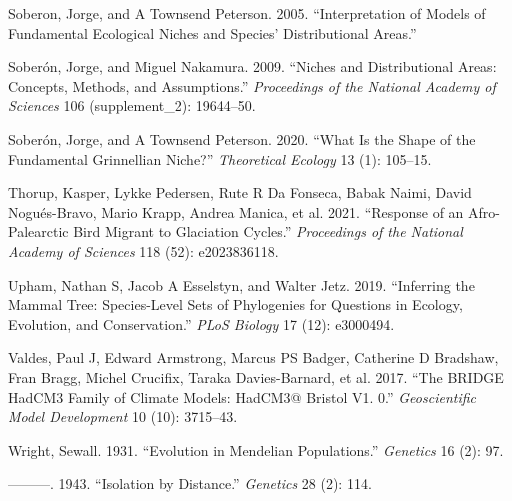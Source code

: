 \documentclass[
]{article}
\newlength{\cslhangindent}
\newlength{\cslentryspacingunit} %
\newenvironment{CSLReferences}[2] %
 {%
  \setlength{\parindent}{0pt}
  \ifodd #1
  \let\oldpar\par
  \def\par{\hangindent=\cslhangindent\oldpar}
  \fi
  \setlength{\parskip}{#2\cslentryspacingunit}
 }%
 {}
\begin{document}
\begin{CSLReferences}{1}{0}
\leavevmode{}%
Soberon, Jorge, and A Townsend Peterson. 2005. {``Interpretation of
Models of Fundamental Ecological Niches and Species' Distributional
Areas.''}

\leavevmode{}%
Soberón, Jorge, and Miguel Nakamura. 2009. {``Niches and Distributional
Areas: Concepts, Methods, and Assumptions.''} \emph{Proceedings of the
National Academy of Sciences} 106 (supplement\_2): 19644--50.

\leavevmode{}%
Soberón, Jorge, and A Townsend Peterson. 2020. {``What Is the Shape of
the Fundamental Grinnellian Niche?''} \emph{Theoretical Ecology} 13 (1):
105--15.

\leavevmode{}%
Thorup, Kasper, Lykke Pedersen, Rute R Da Fonseca, Babak Naimi, David
Nogués-Bravo, Mario Krapp, Andrea Manica, et al. 2021. {``Response of an
Afro-Palearctic Bird Migrant to Glaciation Cycles.''} \emph{Proceedings
of the National Academy of Sciences} 118 (52): e2023836118.

\leavevmode{}%
Upham, Nathan S, Jacob A Esselstyn, and Walter Jetz. 2019. {``Inferring
the Mammal Tree: Species-Level Sets of Phylogenies for Questions in
Ecology, Evolution, and Conservation.''} \emph{PLoS Biology} 17 (12):
e3000494.

\leavevmode{}%
Valdes, Paul J, Edward Armstrong, Marcus PS Badger, Catherine D
Bradshaw, Fran Bragg, Michel Crucifix, Taraka Davies-Barnard, et al.
2017. {``The BRIDGE HadCM3 Family of Climate Models: HadCM3@ Bristol V1.
0.''} \emph{Geoscientific Model Development} 10 (10): 3715--43.

\leavevmode{}%
Wright, Sewall. 1931. {``Evolution in Mendelian Populations.''}
\emph{Genetics} 16 (2): 97.

\leavevmode{}%
---------. 1943. {``Isolation by Distance.''} \emph{Genetics} 28 (2):
114.

\end{CSLReferences}
\end{document}
